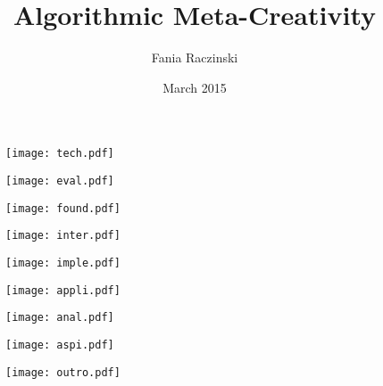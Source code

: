 \documentclass[11pt]{thesis} %
\title{Algorithmic Meta-Creativity}
\author{Fania Raczinski}
\date{March 2015}
\begin{document}
\pagestyle{fania}

\vspace{1cm}
\begin{figure}[!htb]
\centering
  \texttt{[image: tech.pdf]}
\end{figure}
\vspace{1cm}
\begin{figure}[!htb]
\centering
  \texttt{[image: eval.pdf]}
\end{figure}
\vspace{1cm}
\begin{figure}[!htb]
\centering
  \texttt{[image: found.pdf]}
\end{figure}
\vspace{1cm}
\begin{figure}[!htb]
\centering
  \texttt{[image: inter.pdf]}
\end{figure}
\vspace{1cm}
\begin{figure}[!htb]
\centering
  \texttt{[image: imple.pdf]}
\end{figure}
\vspace{1cm}
\begin{figure}[!htb]
\centering
  \texttt{[image: appli.pdf]}
\end{figure}
\vspace{1cm}
\begin{figure}[!htb]
\centering
  \texttt{[image: anal.pdf]}
\end{figure}
\vspace{1cm}
\begin{figure}[!htb]
\centering
  \texttt{[image: aspi.pdf]}
\end{figure}
\vspace{1cm}
\begin{figure}[!htb]
\centering
  \texttt{[image: outro.pdf]}
\end{figure}
\end{document}
